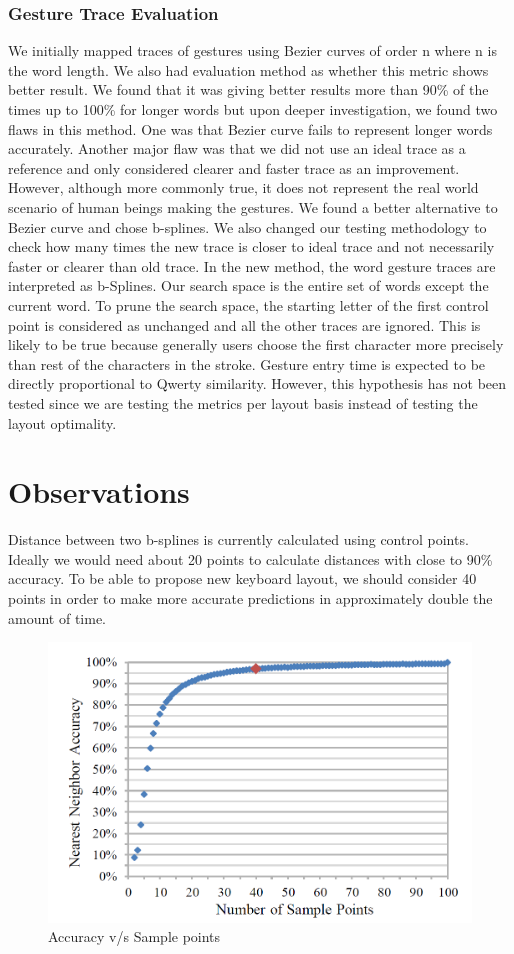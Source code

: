 \documentclass[MTech]{iitmdiss}
\begin{document}
\subsection{Gesture Trace Evaluation}
We initially mapped traces of gestures using Bezier curves of order n where n is the word length. We also had evaluation method as whether this metric shows better result. We found that it was giving better results more than 90\% of the times up to 100\% for longer words but upon deeper investigation, we found two flaws in this method. One was that Bezier curve fails to represent longer words accurately. Another major flaw was that we did not use an ideal trace as a reference and only considered clearer and faster trace as an improvement. However, although more commonly true, it does not represent the real world scenario of human beings making the gestures. We found a better alternative to Bezier curve and chose b-splines. We also changed our testing methodology to check how many times the new trace is closer to ideal trace and not necessarily faster or clearer than old trace.
In the new method, the word gesture traces are interpreted as b-Splines. Our search space is the entire set of words except the current word. To prune the search space, the starting letter of the first control point is considered as unchanged and all the other traces are ignored. This is likely to be true because generally users choose the first character more precisely than rest of the characters in the stroke. Gesture entry time is expected to be directly proportional to Qwerty similarity. However, this hypothesis has not been tested since we are testing the metrics per layout basis instead of testing the layout optimality.

\chapter{Observations}
Distance between two b-splines is currently calculated using control points. Ideally we would need about 20 points to calculate distances with close to 90\% accuracy. To be able to propose new keyboard layout, we should consider 40 points in order to make more accurate predictions in approximately double the amount of time.

\begin{figure}[h!]
	\centering
	\includegraphics[scale=0.5]{Images/accuracy}
	\caption{Accuracy v/s Sample points }
\end{figure}
\end{document}
